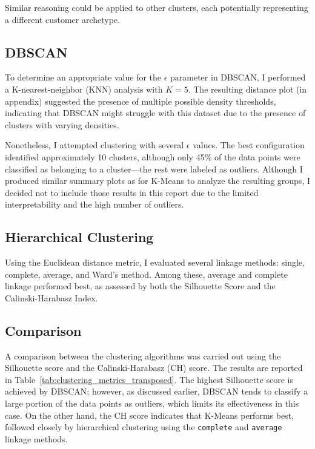 \documentclass[a4paper,11pt]{article}
\begin{document}
Similar reasoning could be applied to other clusters, each potentially representing a different customer archetype.

\subsection{DBSCAN}
To determine an appropriate value for the $\epsilon$ parameter in DBSCAN, I performed a K-nearest-neighbor (KNN) analysis with $K=5$. The resulting distance plot (in appendix) suggested the presence of multiple possible density thresholds, indicating that DBSCAN might struggle with this dataset due to the presence of clusters with varying densities.

Nonetheless, I attempted clustering with several $\epsilon$ values. The best configuration identified approximately 10 clusters, although only 45\% of the data points were classified as belonging to a cluster—the rest were labeled as outliers. Although I produced similar summary plots as for K-Means to analyze the resulting groups, I decided not to include those results in this report due to the limited interpretability and the high number of outliers.

\subsection{Hierarchical Clustering}
Using the Euclidean distance metric, I evaluated several linkage methods: single, complete, average, and Ward’s method. Among these, average and complete linkage performed best, as assessed by both the Silhouette Score and the Calinski-Harabasz Index.
\subsection{Comparison}
A comparison between the clustering algorithms was carried out using the Silhouette score and the Calinski-Harabasz (CH) score. The results are reported in Table~\ref{tab:clustering_metrics_transposed}. The highest Silhouette score is achieved by DBSCAN; however, as discussed earlier, DBSCAN tends to classify a large portion of the data points as outliers, which limits its effectiveness in this case. On the other hand, the CH score indicates that K-Means performs best, followed closely by hierarchical clustering using the \texttt{complete} and \texttt{average} linkage methods.

\begin{table}[h]
\centering
{}
\caption{Comparison of clustering algorithms using Silhouette and Calinski-Harabasz scores.}
\label{tab:clustering_metrics_transposed}
\end{table}
\end{document}
